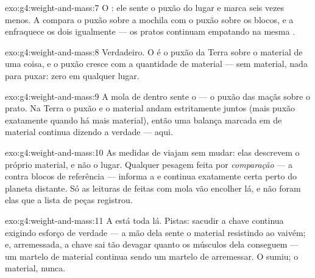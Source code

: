 \begin{solution}{exo:g4:weight-and-mass:7}
O : ele sente o puxão do lugar e marca seis vezes menos. A
 compara o puxão sobre a mochila com o puxão sobre
os blocos, e a  enfraquece os dois igualmente --- os pratos
continuam empatando na mesma .
\end{solution}

\begin{solution}{exo:g4:weight-and-mass:8}
Verdadeiro. O  é o puxão da Terra sobre o material de uma coisa,
e o puxão cresce com a quantidade de material --- sem material, nada
para puxar:  zero em qualquer lugar.
\end{solution}

\begin{solution}{exo:g4:weight-and-mass:9}
A mola de dentro sente o \emph{} --- o puxão das maçãs sobre o
prato. Na Terra o puxão e o material andam estritamente juntos (mais
puxão exatamente quando há mais material), então uma balança marcada
em  de material continua dizendo a verdade --- aqui.
\end{solution}

\begin{solution}{exo:g4:weight-and-mass:10}
As medidas de  viajam sem mudar: elas descrevem o próprio
material, e não o lugar. Qualquer pesagem feita por
\emph{comparação} --- a  contra blocos de
referência --- informa a  e continua exatamente certa perto do
planeta distante. Só as leituras de  feitas com mola vão encolher
lá, e não foram elas que a lista de peças registrou.
\end{solution}

\begin{solution}{exo:g4:weight-and-mass:11}
A  está toda lá. Pistas: sacudir a chave continua exigindo
esforço de verdade --- a mão dela sente o material resistindo ao
vaivém; e, arremessada, a chave sai tão devagar quanto os músculos
dela conseguem --- um martelo de material continua sendo um martelo
de arremessar. O  sumiu; o material, nunca.
\end{solution}
